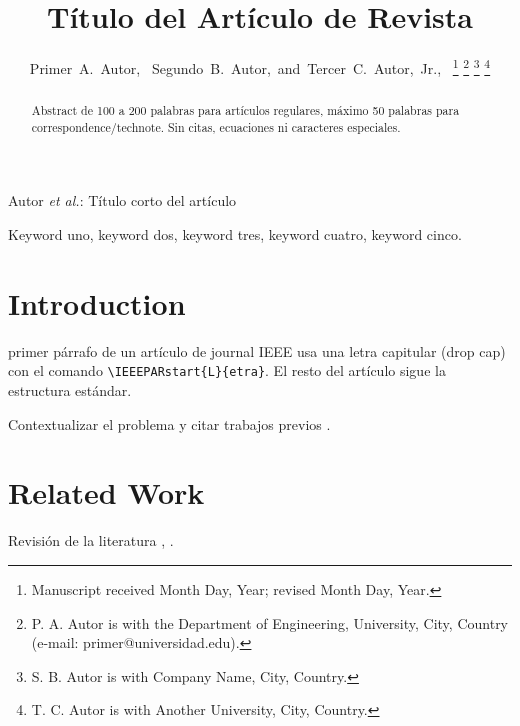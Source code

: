 \documentclass[journal]{IEEEtran}
\begin{document}
\title{Título del Artículo de Revista}

\author{Primer~A.~Autor,~
  Segundo~B.~Autor,~and~Tercer~C.~Autor,~Jr.,~
  \thanks{Manuscript received Month Day, Year; revised Month Day, Year.}
  \thanks{P. A. Autor is with the Department of Engineering, University,
    City, Country (e-mail: primer@universidad.edu).}
  \thanks{S. B. Autor is with Company Name, City, Country.}
  \thanks{T. C. Autor is with Another University, City, Country.}
}

%
{Autor \MakeLowercase{\textit{et al.}}: Título corto del artículo}

\maketitle

\begin{abstract}
  Abstract de 100 a 200 palabras para artículos regulares, máximo 50 palabras
  para correspondence/technote. Sin citas, ecuaciones ni caracteres especiales.
\end{abstract}

\begin{IEEEkeywords}
  Keyword uno, keyword dos, keyword tres, keyword cuatro, keyword cinco.
\end{IEEEkeywords}

\section{Introduction}
\label{sec:intro}

 primer párrafo de un artículo de journal IEEE usa una
letra capitular (drop cap) con el comando \verb|\IEEEPARstart{L}{etra}|.
El resto del artículo sigue la estructura estándar.

Contextualizar el problema y citar trabajos previos \cite{haykin2009neural}.

\section{Related Work}
\label{sec:related}

Revisión de la literatura \cite{smith2020example}, \cite{jones2021analysis}.
\end{document}
